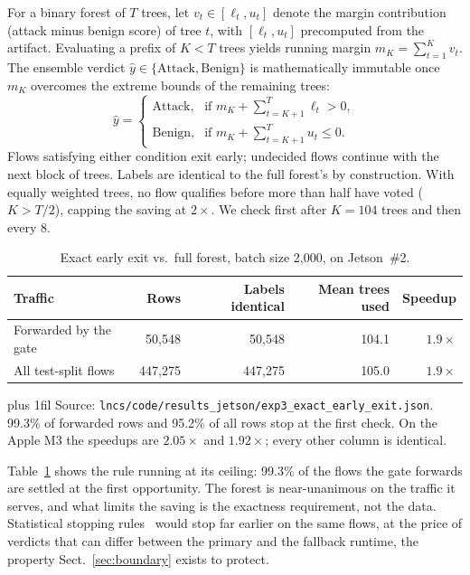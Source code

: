 \documentclass[runningheads]{llncs}
\newcommand{\tabnote}[1]{%
  \vspace{4pt}\par\noindent
  \begin{minipage}{\textwidth}%
    \footnotesize\parindent=0pt\leftskip=0pt\rightskip=0pt\parfillskip=0pt plus 1fil\relax
    #1%
  \end{minipage}}
\begin{document}
For a binary forest of $T$ trees, let $v_t \in [\ell_t, u_t]$ denote the margin contribution (attack minus benign score) of tree $t$, with $[\ell_t, u_t]$ precomputed from the artifact. Evaluating a prefix of $K < T$ trees yields running margin $m_K = \sum_{t=1}^K v_t$. The ensemble verdict $\hat{y} \in \{\text{Attack}, \text{Benign}\}$ is mathematically immutable once $m_K$ overcomes the extreme bounds of the remaining trees:
\begin{equation}
\label{eq:earlyexit}
\hat{y} = \begin{cases}
\text{Attack}, & \text{if } m_K + \displaystyle\sum_{t=K+1}^T \ell_t > 0, \\[4pt]
\text{Benign}, & \text{if } m_K + \displaystyle\sum_{t=K+1}^T u_t \le 0.
\end{cases}
\end{equation}
Flows satisfying either condition exit early; undecided flows continue with the next block of trees. Labels are identical to the full forest's by construction. With equally weighted trees, no flow qualifies before more than half have voted ($K > T/2$), capping the saving at $2\times$. We check first after $K=104$ trees and then every 8.

\begin{table}[htbp]
  \caption{Exact early exit vs.\ full forest, batch size 2{,}000, on Jetson~\#2.}
  \label{tab:earlyexit}
  \centering
  \small
  \begin{tabular}{l r r r r}
    \toprule
    Traffic & Rows & Labels identical & Mean trees used & Speedup \\
    \midrule
    Forwarded by the gate & 50{,}548  & 50{,}548  & 104.1 & $1.9\times$ \\
    All test-split flows  & 447{,}275 & 447{,}275 & 105.0 & $1.9\times$ \\
    \bottomrule
  \end{tabular}
  \tabnote{Source: \texttt{lncs/code/results\_jetson/exp3\_exact\_early\_exit.json}. 99.3\% of forwarded rows and 95.2\% of all rows stop at the first check. On the Apple M3 the speedups are $2.05\times$ and $1.92\times$; every other column is identical.}
\end{table}

Table~\ref{tab:earlyexit} shows the rule running at its ceiling: 99.3\% of the flows the gate forwards are settled at the first opportunity. The forest is near-unanimous on the traffic it serves, and what limits the saving is the exactness requirement, not the data. Statistical stopping rules~\cite{hernandezlobato2009pruning,wang2018qwyc} would stop far earlier on the same flows, at the price of verdicts that can differ between the primary and the fallback runtime, the property Sect.~\ref{sec:boundary} exists to protect.
\end{document}
